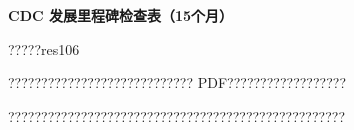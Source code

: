 \documentclass[11pt]{article}
\begin{document}
{\color[HTML]{0A84FF}\LARGE\bfseries CDC 发展里程碑检查表（15个月）\par}
{\color[HTML]{667085}\small ?????res106\par}
\vspace{1em}
???????????????????????????? PDF??????????????????

???????????????????????????????????????????????????
\end{document}
